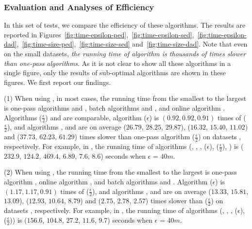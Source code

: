 \subsubsection{Evaluation and Analyses of Efficiency}

In this set of tests, we compare the efficiency of these algorithms.
The results are reported in Figures~\ref{fig:time-epsilon-ped},~\ref{fig:time-epsilon-sed},~\ref{fig:time-epsilon-dad},~\ref{fig:time-size-ped},~\ref{fig:time-size-sed} and~\ref{fig:time-size-dad}.
Note that even on the small datasets, \emph{the running time of algorithm \opt  is thousands of times slower than one-pass algorithms}. As it is not clear to show all these algorithms in a single figure, only the results of sub-optimal algorithms are shown in these figures.
We first report our findings.



\sstab (1) When using \ped, in most cases, the running time from the smallest to the largest is one-pass algorithms \siped and \operb, batch algorithms \tpa and \dpa, and online algorithm \bqsa.
Algorithms \siped($\frac{\epsilon}{2}$) and \operb are comparable, algorithm \siped(${\epsilon}$) is $(0.92, 0.92, 0.91)$ times of \siped($\frac{\epsilon}{2}$), and algorithms \tpa, \dpa and \bqsa are on average
($26.79$, $28.25$, $29.87$), ($16.32$, $15.40$, $11.02$) and ($37.73$, $62.23$, $61.29$)
times slower than one-pass algorithm \siped($\frac{\epsilon}{2}$) on datasets \dSets, respectively.
%
For example, in \mopsi, the running time of algorithms
(\tpa, \dpa, \bqsa, \siped(${\epsilon}$), \siped($\frac{\epsilon}{2}$), \operb ) is ($232.9$, $124.2$, $469.4$, $6.89$, $7.6$, $8.6$) seconds when $\epsilon$ = $40m$.

\sstab (2) When using \sed, the running time from the smallest to the largest is one-pass algorithm \cised, online algorithm \squishe, and batch algorithms \tpa and \dpa. Algorithm \cised(${\epsilon}$) is $(1.17, 1.17, 0.91)$ times of \cised($\frac{\epsilon}{2}$), and algorithms \tpa, \dpa and \squishe are on average
($13.33$, $15.81$, $13.09$), ($12.93$, $10.64$, $8.79$) and
($2.75$, $2.78$, $2.57$) times slower than \cised($\frac{\epsilon}{2}$) on datasets \dSets, respectively.
%
For example, in \mopsi, the running time of algorithms
(\tpa, \dpa, \squishe, \cised($\epsilon$), \cised($\frac{\epsilon}{2}$)) is ($156.6$, $104.8$, $27.2$, $11.6$, $9.7$) seconds when $\epsilon$ = $40m$.

